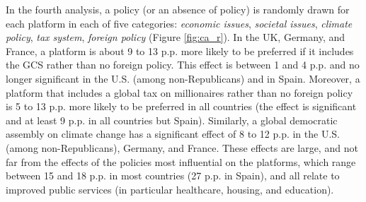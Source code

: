 \begin{bibunit}
In the fourth analysis, a policy (or an absence of policy) is randomly drawn for each platform in each of five categories: \textit{economic issues}, \textit{societal issues}, \textit{climate policy}, \textit{tax system}, \textit{foreign policy} (Figure \ref{fig:ca_r}). 
In the UK, Germany, and France, a platform is about 9 to 13 p.p. more likely to be preferred if it includes the GCS rather than no foreign policy. %
This effect is between 1 and 4 p.p. and no longer significant in the U.S. (among non-Republicans) and in Spain. Moreover, a platform that includes a global tax on millionaires rather than no foreign policy is 5 to 13 p.p. more likely to be preferred in all countries (the effect is significant and at least 9 p.p. in all countries but Spain). 
Similarly, a global democratic assembly on climate change has a significant effect of 8 to 12 p.p. in the U.S. (among non-Republicans), Germany, and France. 
These effects are large, and not far from the effects of the policies most influential on the platforms, which range between 15 and 18 p.p. in most countries (27 p.p. in Spain), and all relate to improved public services (in particular healthcare, housing, and education).
 

\end{bibunit}
